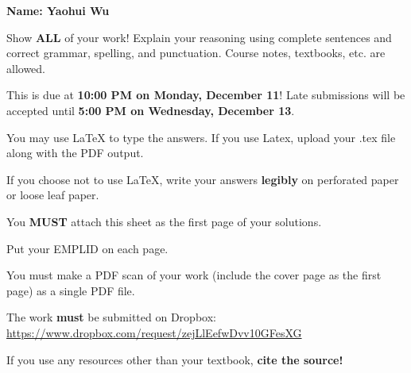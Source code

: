 \documentclass{article}
\theoremstyle{definition}
\newcommand{\0}{\textbf{0}}
\begin{document}
\thispagestyle{empty}


 \hfill {\bf \large Name: Yaohui Wu}

\vspace{1cm}

 Show {\bf ALL} of your work! Explain your reasoning using complete sentences and correct grammar, spelling, and punctuation. Course notes, textbooks, etc. are allowed. 

\vspace{.25cm}

\noindent This is due at {\bf 10:00 PM on Monday, December 11}! Late submissions will be accepted until {\bf 5:00 PM on Wednesday, December 13}.

\vspace{.25cm}

\noindent You may use LaTeX to type the answers. If you use Latex, upload your .tex file along with the PDF output.

\vspace{.25cm}

\noindent If you choose not to use LaTeX, write your answers {\bf legibly} on perforated paper or loose leaf paper. 

\vspace{.25cm}

\noindent You {\bf \large MUST} attach this sheet as the first page of your solutions.

\vspace{.25cm}

\noindent Put your EMPLID on each page.

\vspace{.25cm}

 You must make a PDF scan of your work (include the cover page as the first page) as a single PDF file.

\vspace{.25cm}

\noindent The work {\bf must} be submitted on Dropbox: \href{https://www.dropbox.com/request/zejLlEefwDvv10GFesXG}{https://www.dropbox.com/request/zejLlEefwDvv10GFesXG}

\vspace{.25cm}

\noindent If you use any resources other than your textbook, {\bf cite the source!}

\vspace{.25cm}
\end{document}
